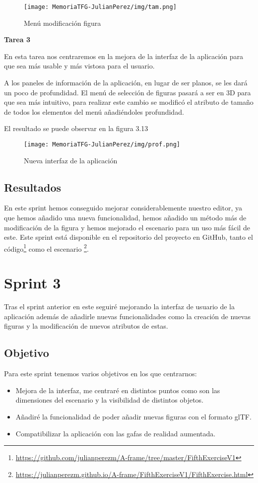 \documentclass[a4paper, 12pt]{book}
\begin{document}
\begin{figure}[H]
  \centering
  \texttt{[image: MemoriaTFG-JulianPerez/img/tam.png]}
  \caption{Menú modificación figura}\label{scrum}
\end{figure}

\textbf{Tarea 3}

En esta tarea nos centraremos en la mejora de la interfaz de la aplicación para que sea más usable y más vistosa para el usuario. 

A los paneles de información de la aplicación, en lugar de ser planos, se les dará un poco de profundidad. El menú de selección de figuras pasará a ser en 3D para que sea más intuitivo, para realizar este cambio se modificó el atributo de tamaño de todos los elementos del menú añadiéndoles profundidad.

El resultado se puede observar en la figura 3.13

\begin{figure}[H]
  \centering
  \texttt{[image: MemoriaTFG-JulianPerez/img/prof.png]}
  \caption{Nueva interfaz de la aplicación}\label{scrum}
\end{figure}

\subsection{Resultados}

En este sprint hemos conseguido mejorar considerablemente nuestro editor, ya que hemos añadido una nueva funcionalidad, hemos añadido un método más de modificación de la figura y hemos mejorado el escenario para un uso más fácil de este. Este sprint está disponible en el repositorio del proyecto en GitHub, tanto el código\footnote{\url{https://github.com/julianperezm/A-frame/tree/master/FifthExerciseV1}} como el escenario \footnote{\url{https://julianperezm.github.io/A-frame/FifthExerciseV1/FifthExercise.html}}.


\section{Sprint 3}

Tras el sprint anterior en este seguiré mejorando la interfaz de usuario de la aplicación además de añadirle nuevas funcionalidades como la creación de nuevas figuras y la modificación de nuevos atributos de estas.

\subsection{Objetivo}
Para este sprint tenemos varios objetivos en los que centrarnos:
\begin{itemize}
    \item Mejora de la interfaz, me centraré en distintos puntos como son las dimensiones del escenario y la visibilidad de distintos objetos.
    \item Añadiré la funcionalidad de poder añadir nuevas figuras con el formato glTF.
    \item Compatibilizar la aplicación con las gafas de realidad aumentada.
\end{itemize}
\end{document}
